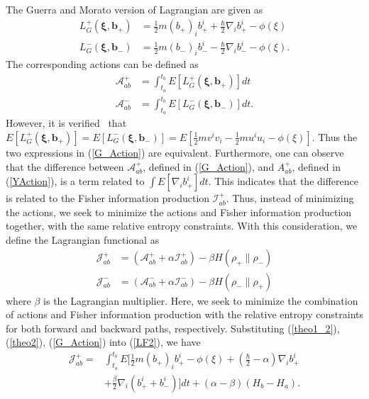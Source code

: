 \documentclass[%
 aip, 
 amsmath,amssymb,amsthm,
 nofootinbib,
 reprint,
]{revtex4-1}
\begin{document}
The Guerra and Morato version of Lagrangian are given as~\cite{Guerra}
\begin{equation}
    \label{L_G2}
    \begin{split}
    L_G^+(\mathbf{\xi, b_+}) &= \frac{1}{2}m(b_+)_ib_+^i + \frac{\hbar}{2}\nabla_ib_+^i - \phi(\xi) \\
    L_G^-(\mathbf{\xi, b_-}) &= \frac{1}{2}m(b_-)_ib_-^i - \frac{\hbar}{2}\nabla_ib_-^i - \phi(\xi).
    \end{split}
\end{equation}
The corresponding actions can be defined as
\begin{equation}
    \label{G_Action}
    \begin{split}
    \mathcal{A}_{ab}^+ &= \int_{t_a}^{t_b} E [L_G^+(\mathbf{\xi, b_+})]dt \\
    \mathcal{A}_{ab}^- &= \int_{t_a}^{t_b} E [L_G^-(\mathbf{\xi, b_-})]dt .
    \end{split}
\end{equation}
However, it is verified~\cite{Nelsonbook} that $E [L_G^+(\mathbf{\xi, b_+})]=E [L_G^-(\mathbf{\xi, b_-})] = E[\frac{1}{2}mv^iv_i-\frac{1}{2}m u^iu_i- \phi(\xi)]$. Thus the two expressions in (\ref{G_Action}) are equivalent. Furthermore, one can observe that the difference between $\mathcal{A}_{ab}^+$, defined in (\ref{G_Action}), and $A_{ab}^+$, defined in (\ref{YAction}), is a term related to $\int E[\nabla_i b_+^i]dt$. This indicates that the difference is related to the Fisher information production $\mathcal{I}_{ab}^+$. Thus, instead of minimizing the actions, we seek to minimize the actions and Fisher information production together, with the same relative entropy constraints. With this consideration, we define the Lagrangian functional as
\begin{equation}
    \label{LF2}
    \begin{split}
    \mathcal{J}_{ab}^+ &= (\mathcal{A}_{ab}^+ + \alpha \mathcal{I}_{ab}^+) - \beta H(\rho_+\|\rho_-) \\
    \mathcal{J}_{ab}^- &= (\mathcal{A}_{ab}^- + \alpha \mathcal{I}_{ab}^-) - \beta H(\rho_-\|\rho_+) 
    \end{split}
\end{equation}
where $\beta$ is the Lagrangian multiplier. Here, we seek to minimize the combination of actions and Fisher information production with the relative entropy constraints for both forward and backward paths, respectively. Substituting (\ref{theo1_2}), (\ref{theo2}), (\ref{G_Action}) into (\ref{LF2}), we have
\begin{equation}
    \begin{split}
    \mathcal{J}_{ab}^+ =& \int_{t_a}^{t_b} E[\frac{1}{2}m(b_+)_ib_+^i - \phi(\xi) +(\frac{\hbar}{2}-\alpha)\nabla_ib_+^i \\ &+\frac{\beta}{2}\nabla_i(b_+^i + b_-^i)]dt
     +(\alpha-\beta)(H_b - H_a).
    \end{split}
\end{equation}
\end{document}
